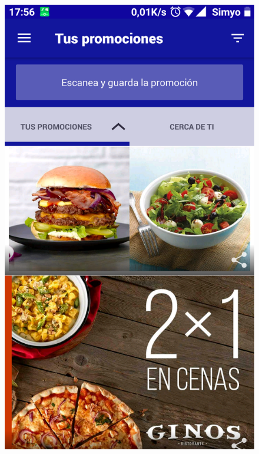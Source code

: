 \documentclass[twoside]{report}
\begin{document}
\begin{figure}[H]
\begin{center}
\includegraphics[scale=0.25]{images/restaurantes/vips0.png}

\end{center}
\end{figure}
\end{document}
